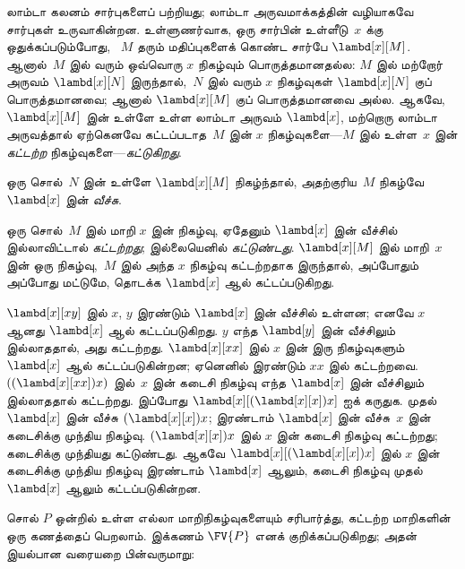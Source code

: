 \documentclass[../../../include/open-logic-section]{subfiles}
\begin{document}

லாம்டா கலனம் சார்புகளைப் பற்றியது; லாம்டா அருவமாக்கத்தின் வழியாகவே சார்புகள்
உருவாகின்றன. உள்ளுணர்வாக, ஒரு சார்பின் உள்ளீடு~$x$ க்கு ஒதுக்கப்படும்போது,
~$M$ தரும் மதிப்புகளைக் கொண்ட சார்பே $\lambd[x][M]$. ஆனால்~$M$ இல் வரும்
ஒவ்வொரு $x$ நிகழ்வும் பொருத்தமானதல்ல: $M$ இல் மற்றோர் அருவம்
$\lambd[x][N]$ இருந்தால்,~$N$ இல் வரும் $x$ நிகழ்வுகள் $\lambd[x][N]$ குப்
பொருத்தமானவை; ஆனால் $\lambd[x][M]$ குப் பொருத்தமானவை அல்ல. ஆகவே,
$\lambd[x][M]$ இன் உள்ளே உள்ள லாம்டா அருவம் $\lambd[x]$, மற்றொரு லாம்டா
அருவத்தால் ஏற்கெனவே கட்டப்படாத~$M$ இன் $x$ நிகழ்வுகளை---$M$ இல் உள்ள~$x$ இன்
\emph{கட்டற்ற} நிகழ்வுகளை---\emph{கட்டுகிறது}.

\begin{defn}[வீச்சு]
ஒரு சொல்~$N$ இன் உள்ளே $\lambd[x][M]$ நிகழ்ந்தால், அதற்குரிய~$M$ நிகழ்வே
$\lambd[x]$ இன் \emph{வீச்சு}.
\end{defn}


\begin{defn}[கட்டற்ற மற்றும் கட்டுண்ட நிகழ்வு]
  ஒரு சொல்~$M$ இல் மாறி $x$ இன் நிகழ்வு, ஏதேனும் $\lambd[x]$ இன் வீச்சில்
  இல்லாவிட்டால் \emph{கட்டற்றது}; இல்லையெனில் \emph{கட்டுண்டது}.
  $\lambd[x][M]$ இல் மாறி~$x$ இன் ஒரு நிகழ்வு,~$M$ இல் அந்த $x$ நிகழ்வு
  கட்டற்றதாக இருந்தால், அப்போதும் அப்போது மட்டுமே, தொடக்க $\lambd[x]$ ஆல்
  கட்டப்படுகிறது.
\end{defn}

\begin{ex}
  $\lambd[x][x y]$ இல் $x$, $y$ இரண்டும் $\lambd[x]$ இன் வீச்சில் உள்ளன;
  எனவே $x$ ஆனது $\lambd[x]$ ஆல் கட்டப்படுகிறது. $y$ எந்த $\lambd[y]$ இன்
  வீச்சிலும் இல்லாததால், அது கட்டற்றது. $\lambd[x][x x]$ இல் $x$ இன் இரு
  நிகழ்வுகளும்~$\lambd[x]$ ஆல் கட்டப்படுகின்றன; ஏனெனில் இரண்டும் $xx$ இல்
  கட்டற்றவை. $((\lambd[x][xx])x)$ இல்~$x$ இன் கடைசி நிகழ்வு எந்த
  $\lambd[x]$ இன் வீச்சிலும் இல்லாததால் கட்டற்றது. இப்போது
  $\lambd[x][(\lambd[x][x])x]$ ஐக் கருதுக. முதல் $\lambd[x]$ இன் வீச்சு
  $(\lambd[x][x])x$; இரண்டாம் $\lambd[x]$ இன் வீச்சு~$x$ இன் கடைசிக்கு
  முந்திய நிகழ்வு. $(\lambd[x][x])x$ இல் $x$ இன் கடைசி நிகழ்வு கட்டற்றது;
  கடைசிக்கு முந்தியது கட்டுண்டது. ஆகவே
  $\lambd[x][(\lambd[x][x])x]$ இல் $x$ இன் கடைசிக்கு முந்திய நிகழ்வு இரண்டாம்
  $\lambd[x]$ ஆலும், கடைசி நிகழ்வு முதல் $\lambd[x]$ ஆலும் கட்டப்படுகின்றன.
\end{ex}

சொல் $P$ ஒன்றில் உள்ள எல்லா மாறிநிகழ்வுகளையும் சரிபார்த்து, கட்டற்ற மாறிகளின்
ஒரு கணத்தைப் பெறலாம். இக்கணம் $\FV{P}$ எனக் குறிக்கப்படுகிறது; அதன் இயல்பான
வரையறை பின்வருமாறு:
\end{document}
